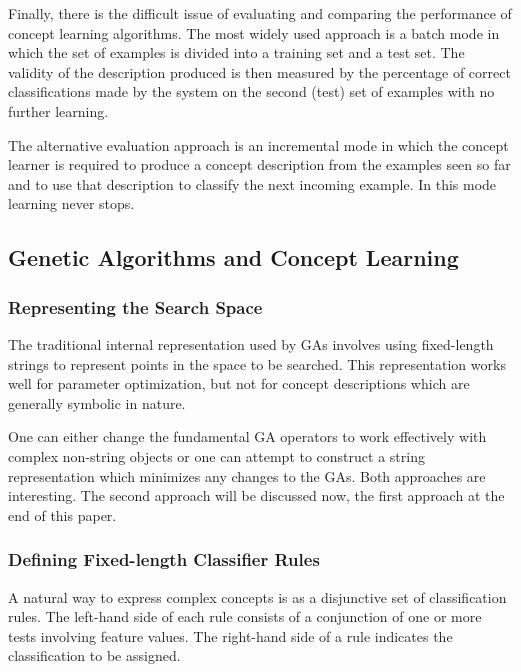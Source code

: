 \documentclass[12pt]{article}
\begin{document}
Finally, there is the difficult issue of evaluating and comparing the performance of concept learning algorithms. The most widely used approach is a batch mode in which the set of examples is divided into a training set and a test set. The validity of the description produced is then measured by the percentage of correct classifications made by the system on the second (test) set of examples with no further learning.

The alternative evaluation approach is an incremental mode in which the concept learner is required to produce a concept description from the examples seen so far and to use that description to classify the next incoming example. In this mode learning never stops.

\subsection{Genetic Algorithms and Concept Learning}

\subsubsection{Representing the Search Space}
The traditional internal representation used by GAs involves using fixed-length strings to represent points in the space to be searched. This representation works well for parameter optimization, but not for concept descriptions which are generally symbolic in nature.

One can either change the fundamental GA operators to work effectively with complex non-string objects or one can attempt to construct a string representation which minimizes any changes to the GAs. Both approaches are interesting. The second approach will be discussed now, the first approach at the end of this paper.

\subsubsection{Defining Fixed-length Classifier Rules}
A natural way to express complex concepts is as a disjunctive set of classification rules. The left-hand side of each rule consists of a conjunction of one or more tests involving feature values. The right-hand side of a rule indicates the classification to be assigned.
\end{document}
